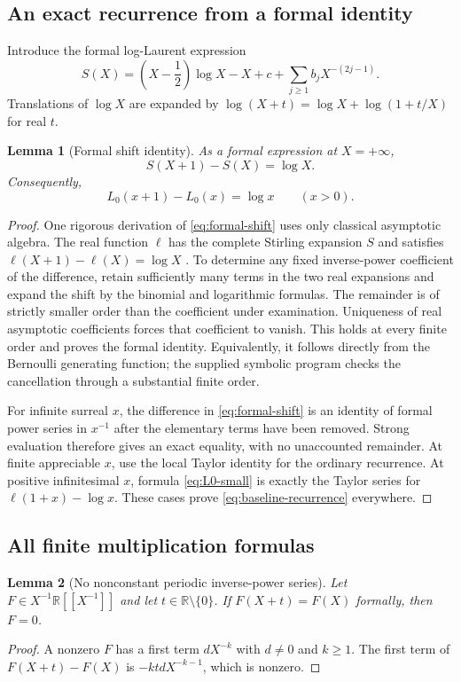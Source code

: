 \documentclass[11pt,letterpaper]{article}
\numberwithin{equation}{section}
\theoremstyle{plain}
\newtheorem{lemma}[lemma]{Lemma}
\theoremstyle{definition}
\theoremstyle{remark}
\newcommand{\R}{\mathbb R}
\begin{document}
\subsection{An exact recurrence from a formal identity}
Introduce the formal log-Laurent expression
\[
 S(X)=\left(X-\frac12\right)\log X-X+c+
 \sum_{j\ge1}b_jX^{-(2j-1)}.
\]
Translations of $\log X$ are expanded by
$\log(X+t)=\log X+\log(1+t/X)$ for real $t$.

\begin{lemma}[Formal shift identity]\label{lem:formal-shift}
As a formal expression at $X=+\infty$,
\begin{equation}\label{eq:formal-shift}
 S(X+1)-S(X)=\log X.
\end{equation}
Consequently,
\begin{equation}\label{eq:baseline-recurrence}
 L_0(x+1)-L_0(x)=\log x\qquad(x>0).
\end{equation}
\end{lemma}

\begin{proof}
One rigorous derivation of \eqref{eq:formal-shift} uses only classical
asymptotic algebra. The real function $\ell$ has the complete Stirling
expansion $S$ and satisfies $\ell(X+1)-\ell(X)=\log X$
\cite{DLMF55,DLMF511}. To determine any fixed inverse-power coefficient of
the difference, retain sufficiently many terms in the two real expansions
and expand the shift by the binomial and logarithmic formulas. The remainder
is of strictly smaller order than the coefficient under examination.
Uniqueness of real asymptotic coefficients forces that coefficient to vanish.
This holds at every finite order and proves the formal identity. Equivalently,
it follows directly from the Bernoulli generating function; the supplied
symbolic program checks the cancellation through a substantial finite order.

For infinite surreal $x$, the difference in \eqref{eq:formal-shift} is an
identity of formal power series in $x^{-1}$ after the elementary terms have
been removed. Strong evaluation therefore gives an exact equality, with no
unaccounted remainder. At finite appreciable $x$, use the local Taylor
identity for the ordinary recurrence. At positive infinitesimal $x$, formula
\eqref{eq:L0-small} is exactly the Taylor series for $\ell(1+x)-\log x$.
These cases prove \eqref{eq:baseline-recurrence} everywhere.
\end{proof}

\subsection{All finite multiplication formulas}
\begin{lemma}[No nonconstant periodic inverse-power series]\label{lem:periodic}
Let $F\in X^{-1}\R[[X^{-1}]]$ and let $t\in\R\setminus\{0\}$.
If $F(X+t)=F(X)$ formally, then $F=0$.
\end{lemma}
\begin{proof}
A nonzero $F$ has a first term $dX^{-k}$ with $d\ne0$ and $k\ge1$.
The first term of $F(X+t)-F(X)$ is $-ktdX^{-k-1}$, which is nonzero.
\end{proof}
\end{document}

